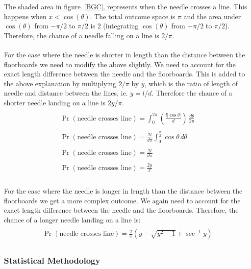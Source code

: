 \noindent
The shaded area in figure~\ref{BGC}, represents when the needle crosses a line. This happens when
$x< \cos(\theta)$. The total outcome space is $\pi$ and the area under $\cos(\theta)$ from $-\pi/2$ to $\pi/2$ is 2 (integrating $\cos(\theta)$ from $-\pi/2$ to $\pi/2$). Therefore, the chance of a needle falling on a line is $2/\pi$.\\
\\
For the case where the needle is shorter in length than the distance between the floorboards we need to modify the above slightly. We need to account for the exact length difference between the needle and the floorboards. This is added to the above explanation by multiplying $2/\pi$ by $y$, which is the ratio of length of needle and distance between the lines, ie. $y=l/d$. Therefore the chance of a shorter needle landing on a line is $2y/\pi$.
\begin{displaymath}
\begin{array}{l}
\\\Pr(\text{needle crosses line})=\displaystyle\int^{2\pi}_0 (\frac{l|\cos\theta|}{d})\,\frac{d\theta}{2\pi}\\
\\\Pr (\text{needle crosses line}) =\displaystyle\frac{2l}{d\pi}\int^{\frac{\pi}{2}}_0 \cos\theta\,d\theta\\
\\\Pr (\text{needle crosses line}) =\displaystyle\frac{2l}{d\pi}\\
\\\Pr (\text{needle crosses line}) =\displaystyle\frac{2y}{\pi}\\
\end{array}
\end{displaymath}
\\
\noindent
For the case where the needle is longer in length than the distance between the floorboards we get a more complex outcome. We again need to account for the exact length difference between the needle and the floorboards. Therefore, the chance of a longer needle landing on a line is:
\begin{displaymath}
\begin{array}{l}
\\\Pr (\text{needle crosses line}) =\frac{2}{\pi}({y-\sqrt{y^2-1}+\sec^{-1}y})\\
\end{array}
\end{displaymath}

\subsubsection*{Statistical Methodology}

